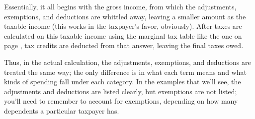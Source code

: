Essentially, it all begins with the gross income, from which the adjustments, exemptions, and deductions are whittled away, leaving a smaller amount as the taxable income (this works in the taxpayer's favor, obviously).  After taxes are calculated on this taxable income using the marginal tax table like the one on page \pageref{Tax Table}, tax credits are deducted from that answer, leaving the final taxes owed.

Thus, in the actual calculation, the adjustments, exemptions, and deductions are treated the same way; the only difference is in what each term means and what kinds of spending fall under each category.  In the examples that we'll see, the adjustments and deductions are listed clearly, but exemptions are not listed; you'll need to remember to account for exemptions, depending on how many dependents a particular taxpayer has.

